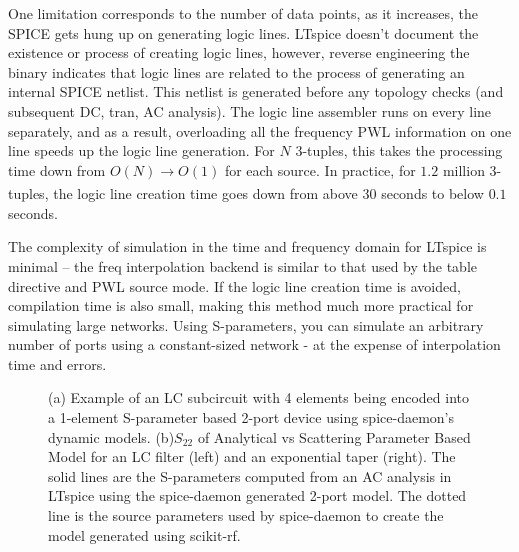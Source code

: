 \documentclass[]{article}
\newcommand{\cf}[1]{\textsf{#1}}
\begin{document}
One limitation corresponds to the number of data points, as it increases, the SPICE
gets hung up on generating logic lines. LTspice doesn't document the existence or process
of creating logic lines, however, reverse engineering the binary indicates that logic lines
are related to the process of generating an internal SPICE netlist. This netlist is generated
before any topology checks (and subsequent DC, tran, AC analysis). The logic line assembler runs
on every line separately, and as a result, overloading all the frequency PWL information on
one line speeds up the logic line generation. For $N$ 3-tuples, this takes the processing time
down from $O(N)\xrightarrow[]{} O(1)$ for each source. In practice, for $1.2$ million 3-tuples,
the logic line creation time goes down from above $30$ seconds to below $0.1$ seconds.

The complexity of simulation in the time and frequency domain for LTspice is minimal -- the \cf{freq}
interpolation backend is similar to that used by the \cf{table} directive and \cf{PWL} source mode.
If the logic line creation time is avoided, compilation time is also small, making this method
much more practical for simulating large networks. Using S-parameters, you can simulate an arbitrary
number of ports using a constant-sized network - at the expense of interpolation time and errors. 

\begin{figure}
    \centering

    
    \caption{(a) Example of an LC subcircuit with 4 elements being encoded into a 1-element
    S-parameter based 2-port device using spice-daemon's dynamic models.
    (b)$S_{22}$ of Analytical vs Scattering Parameter Based Model
    for an LC filter (left) and an exponential taper (right). The solid lines are the S-parameters
    computed from an AC analysis in LTspice using the spice-daemon generated 2-port model. The 
    dotted line is the source parameters used by spice-daemon to create the model generated
    using \cf{scikit-rf}.}
\end{figure}
\end{document}
